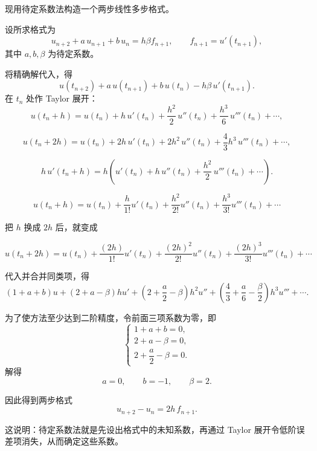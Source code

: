 \begin{example}
现用待定系数法构造一个两步线性多步格式。

设所求格式为
\[
u_{n+2}+a\,u_{n+1}+b\,u_n=h\beta f_{n+1},
\qquad f_{n+1}=u'(t_{n+1}),
\]
其中 \(a,b,\beta\) 为待定系数。

将精确解代入，得
\[
u(t_{n+2})+a\,u(t_{n+1})+b\,u(t_n)-h\beta\,u'(t_{n+1}).
\]
在 \(t_n\) 处作 Taylor 展开：
\[
u(t_n+h)=u(t_n)+h\,u'(t_n)+\frac{h^2}{2}\,u''(t_n)+\frac{h^3}{6}\,u'''(t_n)+\cdots,
\]

\[
u(t_n+2h)=u(t_n)+2h\,u'(t_n)+2h^2\,u''(t_n)+\frac{4}{3}h^3\,u'''(t_n)+\cdots,
\]

\[
h\,u'(t_n+h)=h\left(u'(t_n)+h\,u''(t_n)+\frac{h^2}{2}\,u'''(t_n)+\cdots\right).
\]
\begin{dxtips}
    \[
u(t_n+h)=u(t_n)+\frac{h}{1!}u'(t_n)+\frac{h^2}{2!}u''(t_n)+\frac{h^3}{3!}u'''(t_n)+\cdots
\]

把 \(h\) 换成 \(2h\) 后，就变成

\[
u(t_n+2h)=u(t_n)+\frac{(2h)}{1!}u'(t_n)+\frac{(2h)^2}{2!}u''(t_n)+\frac{(2h)^3}{3!}u'''(t_n)+\cdots
\]
\end{dxtips}
代入并合并同类项，得
\[
(1+a+b)u+(2+a-\beta)hu'
+\left(2+\frac{a}{2}-\beta\right)h^2u''
+\left(\frac{4}{3}+\frac{a}{6}-\frac{\beta}{2}\right)h^3u'''
+\cdots.
\]

为了使方法至少达到二阶精度，令前面三项系数为零，即
\[
\begin{cases}
1+a+b=0,\\
2+a-\beta=0,\\
2+\dfrac{a}{2}-\beta=0.
\end{cases}
\]
解得
\[
a=0,\qquad b=-1,\qquad \beta=2.
\]

因此得到两步格式
\[
u_{n+2}-u_n=2h\,f_{n+1}.
\]

这说明：待定系数法就是先设出格式中的未知系数，再通过 Taylor 展开令低阶误差项消失，从而确定这些系数。
\end{example}
